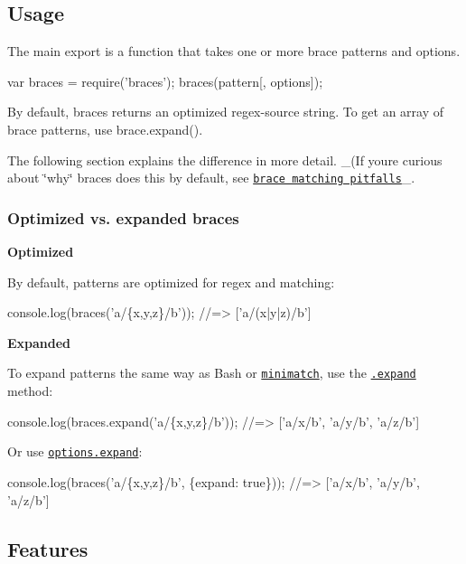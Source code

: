 \subsection*{Usage}

The main export is a function that takes one or more brace {\ttfamily patterns} and {\ttfamily options}.


\begin{DoxyCode}
var braces = require('braces');
braces(pattern[, options]);
\end{DoxyCode}


By default, braces returns an optimized regex-\/source string. To get an array of brace patterns, use {\ttfamily brace.\+expand()}.

The following section explains the difference in more detail. \+\_\+(If you\textquotesingle{}re curious about \char`\"{}why\char`\"{} braces does this by default, see \href{#brace-matching-pitfalls}{\tt brace matching pitfalls}\+\_\+.

\subsubsection*{Optimized vs. expanded braces}

{\bfseries Optimized}

By default, patterns are optimized for regex and matching\+:


\begin{DoxyCode}
console.log(braces('a/\{x,y,z\}/b'));
//=> ['a/(x|y|z)/b']
\end{DoxyCode}


{\bfseries Expanded}

To expand patterns the same way as Bash or \href{https://github.com/isaacs/minimatch}{\tt minimatch}, use the \href{#expand}{\tt .expand} method\+:


\begin{DoxyCode}
console.log(braces.expand('a/\{x,y,z\}/b'));
//=> ['a/x/b', 'a/y/b', 'a/z/b']
\end{DoxyCode}


Or use \href{#optionsexpand}{\tt options.\+expand}\+:


\begin{DoxyCode}
console.log(braces('a/\{x,y,z\}/b', \{expand: true\}));
//=> ['a/x/b', 'a/y/b', 'a/z/b']
\end{DoxyCode}


\subsection*{Features}


